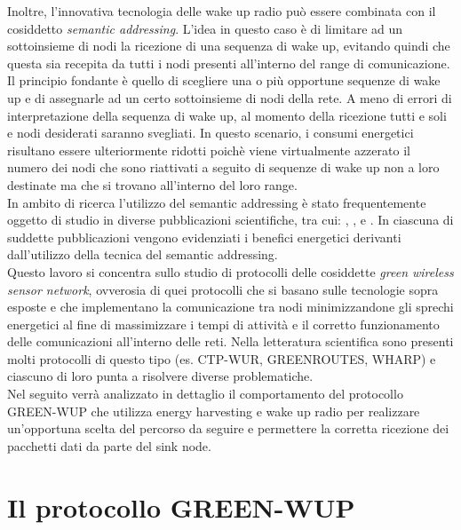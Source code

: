 \documentclass[binding=0.6cm,TFA]{sapthesis}
\begin{document}
\newpage
Inoltre, l'innovativa tecnologia delle wake up radio può essere combinata con il cosiddetto \emph{semantic addressing}. L'idea in questo caso è di limitare
ad un sottoinsieme di nodi la ricezione di una sequenza di wake up, evitando quindi che questa sia recepita da tutti i nodi presenti all'interno
del range di comunicazione. Il principio fondante è quello di scegliere una o più opportune sequenze di wake up e di assegnarle ad un certo
sottoinsieme di nodi della rete. A meno di errori di interpretazione della sequenza di wake up, al momento della ricezione tutti e soli e nodi desiderati
saranno svegliati. In questo scenario, i consumi energetici risultano essere ulteriormente ridotti poichè viene virtualmente azzerato il numero dei nodi
che sono riattivati a seguito di sequenze di wake up non a loro destinate ma che si trovano all'interno del loro range.\\

In ambito di ricerca l'utilizzo del semantic addressing è stato frequentemente oggetto di studio in diverse pubblicazioni scientifiche, tra cui:
\cite{novel-wake-up-receiver-paper}, \cite{beyond-duty-cycling-paper}, e \cite{ctp-wur-paper}. In ciascuna di suddette pubblicazioni vengono
evidenziati i benefici energetici derivanti dall'utilizzo della tecnica del semantic addressing.\\

Questo lavoro si concentra sullo studio di protocolli delle cosiddette \emph{green wireless sensor network}, ovverosia di quei protocolli che si basano
sulle tecnologie sopra esposte e che implementano la comunicazione tra nodi minimizzandone gli sprechi energetici al fine di massimizzare
i tempi di attività e il corretto funzionamento delle comunicazioni all'interno delle reti. Nella letteratura scientifica
sono presenti molti protocolli di questo tipo (es. CTP-WUR, GREENROUTES, WHARP) e ciascuno di loro punta a risolvere diverse problematiche.\\

Nel seguito verrà analizzato in dettaglio il comportamento del protocollo GREEN-WUP che utilizza energy harvesting e wake up radio per realizzare
un'opportuna scelta del percorso da seguire e permettere la corretta ricezione dei pacchetti dati da parte del sink node.\\

\chapter{Il protocollo GREEN-WUP}
\end{document}
